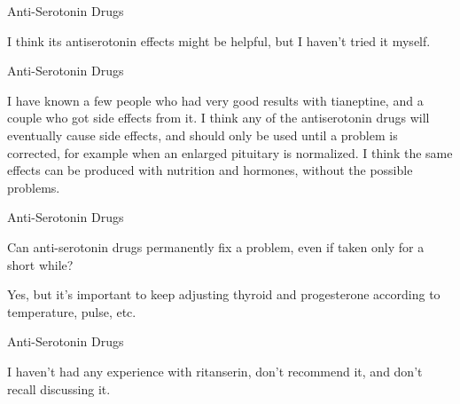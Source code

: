 \documentclass[11pt,oneside,openany,extrafontsizes]{memoir}
\begin{document}
\begin{standalonequote}{Anti-Serotonin Drugs}

    \begin{answer}
        I think its antiserotonin effects might be helpful, but I haven't tried it myself.
    \end{answer}
\end{standalonequote}

\begin{standalonequote}{Anti-Serotonin Drugs}

    \begin{answer}
        I have known a few people who had very good results with tianeptine, and a couple who got side effects from it. I think any of the antiserotonin drugs will eventually cause side effects, and should only be used until a problem is corrected, for example when an enlarged pituitary is normalized. I think the same effects can be produced with nutrition and hormones, without the possible problems.
    \end{answer}
\end{standalonequote}

\begin{qaexchange}{Anti-Serotonin Drugs}

    \begin{question}
        Can anti-serotonin drugs permanently fix a problem, even if taken only for a short while?
    \end{question}

    \begin{answer}
        Yes, but it's important to keep adjusting thyroid and progesterone according to temperature, pulse, etc.
    \end{answer}
\end{qaexchange}

\begin{standalonequote}{Anti-Serotonin Drugs}

    \begin{answer}
        I haven't had any experience with ritanserin, don't recommend it, and don't recall discussing it.
    \end{answer}
\end{standalonequote}
\end{document}
